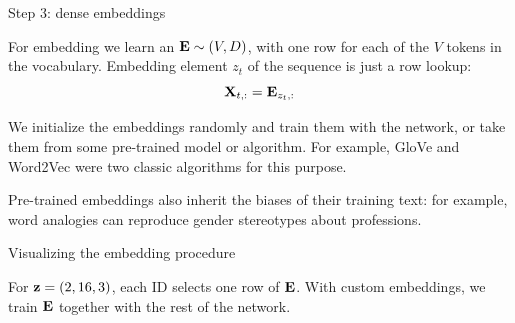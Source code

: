 \begin{frame}{Step 3: dense embeddings}
    \setlength{\parskip}{4pt}
    \setlength{\abovedisplayskip}{7pt}
    \setlength{\belowdisplayskip}{7pt}

    For embedding we learn an  $\boldsymbol{\mathbf{E}}\sim(V,D)$, with one row for each of the $V$ tokens in the vocabulary. Embedding element $z_t$ of the sequence is just a row lookup:
    \[
        {\boldsymbol{\mathbf{X}}}_{t,:}={\boldsymbol{\mathbf{E}}}_{z_t,:}
    \]

    We initialize the embeddings randomly and train them with the network, or take them from some pre-trained model or algorithm.
    For example, GloVe and Word2Vec were two classic algorithms for this purpose.

    Pre-trained embeddings also inherit the biases of their training text:
    for example, word analogies can reproduce gender stereotypes about
    professions.


\end{frame}

\begin{whiteframe}{Visualizing the embedding procedure}

    \vspace{0.5em}
    \begin{center}
        
    \end{center}

    \vspace{0.6em}
    For $\boldsymbol{\mathbf{z}}=(2,16,3)$, each ID selects one row of $\boldsymbol{\mathbf{E}}$. With custom embeddings, we train
    $\boldsymbol{\mathbf{E}}$ together with the rest of the network.

\end{whiteframe}


